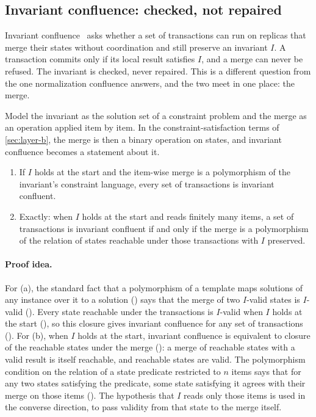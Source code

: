 \subsection{Invariant confluence: checked, not repaired}\label{sec:crdt-iconf}

Invariant confluence~\cite{bailis2014} asks whether a set of transactions can run on replicas that
merge their states without coordination and still preserve an invariant $I$. A transaction commits
only if its local result satisfies $I$, and a merge can never be refused. The invariant is checked,
never repaired. This is a different question from the one normalization confluence answers, and the
two meet in one place: the merge.

Model the invariant as the solution set of a constraint problem and the merge as an operation
applied item by item. In the constraint-satisfaction terms of \cref{sec:layer-b}, the merge is then
a binary operation on states, and invariant confluence becomes a statement about it.

\begin{theorem}\label{thm:iconf}
\leavevmode
\begin{enumerate}[label=(\alph*)]
  \item If $I$ holds at the start and the item-wise merge is a polymorphism of the invariant's
    constraint language, every set of transactions is invariant confluent.
  \item Exactly: when $I$ holds at the start and reads finitely many items, a set of transactions is
    invariant confluent if and only if the merge is a polymorphism of the relation of states
    reachable under those transactions with $I$ preserved.
\end{enumerate}
\end{theorem}

\paragraph{Proof idea.}
For (a), the standard fact that a polymorphism of a template maps solutions of any instance over it
to a solution () says that the merge of two $I$-valid states is $I$-valid
(). Every state reachable under the transactions is $I$-valid when $I$ holds at the
start (), so this closure gives invariant confluence for any set of transactions
(). For (b), when $I$ holds at the start, invariant confluence is equivalent to
closure of the reachable states under the merge (): a merge of reachable
states with a valid result is itself reachable, and reachable states are valid. The polymorphism
condition on the relation of a state predicate restricted to $n$ items says that for any two states
satisfying the predicate, some state satisfying it agrees with their merge on those items
(). The hypothesis that $I$ reads only those items is used in the converse
direction, to pass validity from that state to the merge itself.


